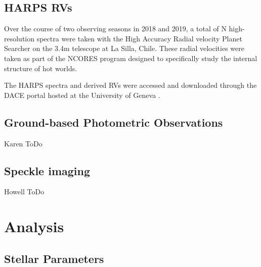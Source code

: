 \documentclass[fleqn,usenatbib]{mnras}
\begin{document}
\subsection{HARPS RVs}
Over the course of two observing seasons in 2018 and 2019, a total of N high-resolution spectra were taken with the High Accuracy Radial velocity Planet Searcher on the 3.4m telescope at La Silla, Chile.
These radial velocities were taken as part of the NCORES program designed to specifically study the internal structure of hot worlds.

The HARPS spectra and derived RVs were accessed and downloaded through the DACE portal hosted at the University of Geneva \citep{2015ASPC..495....7B}.

\subsection{Ground-based Photometric Observations}
Karen ToDo

\subsection{Speckle imaging}
Howell ToDo

\section{Analysis}

\subsection{Stellar Parameters}
\end{document}
